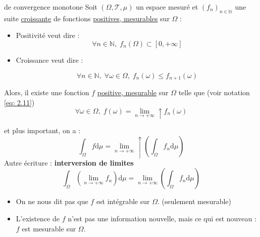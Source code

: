 \begin{Theorem}{de convergence monotone}{}
Soit $(\Omega, \mathcal{T}, \mu)$ un espace mesuré et $(f_n ) _{n \in \mathbb{N}}$ une suite \underline{croissante} de fonctions \underline{positives, mesurables} sur $\Omega$ : 

\begin{itemize}

    \item Positivité veut dire :  
      \begin{equation}
        \forall n \in \mathbb{N}, \; f_n (\Omega) \subset [0, + \infty]
      \end{equation}

    \item Croissance veut dire : 

\begin{equation}
  \forall n\in \mathbb{N}, \; \forall \omega \in \Omega, \; f_n(\omega) \le f _{n+1} (\omega)
\end{equation}
\end{itemize}


Alors, il existe une fonction $f$ \underline{positive, mesurable} sur $\Omega$ telle que  (voir notation \ref{eq: 2.11})
\begin{equation}
  \forall \omega \in \Omega, \; f(\omega) = \underset{n \to + \infty}{\lim}\uparrow f_n(\omega)
\end{equation}

et plus important, on a : 
\begin{equation}
  \boxed{\int_{\Omega}^{} f \mathrm{d}\mu = \underset{n \to + \infty}{\lim} \uparrow \left( \int_{\Omega}^{} f_n \mathrm{d}\mu \right)}
\end{equation}
Autre écriture : \textbf{interversion de limites}
\begin{equation}
  \boxed{\int_{\Omega}^{} \left( \underset{n \to + \infty}{\lim} f_n \right) \mathrm{d}\mu = \underset{n \to + \infty}{\lim}  \left( \int_{\Omega}^{} f_n \mathrm{d}\mu \right)}
\end{equation}
\end{Theorem}

\begin{note}{}{}
  \begin{itemize}

      \item 
On ne nous dit pas que $f$ est intégrable sur $\Omega$. (seulement mesurable)

\item 
L'existence de $f$ n'est pas une information nouvelle, mais ce qui est nouveau : $f$ est mesurable sur $\Omega$.

  \end{itemize}

\end{note}

